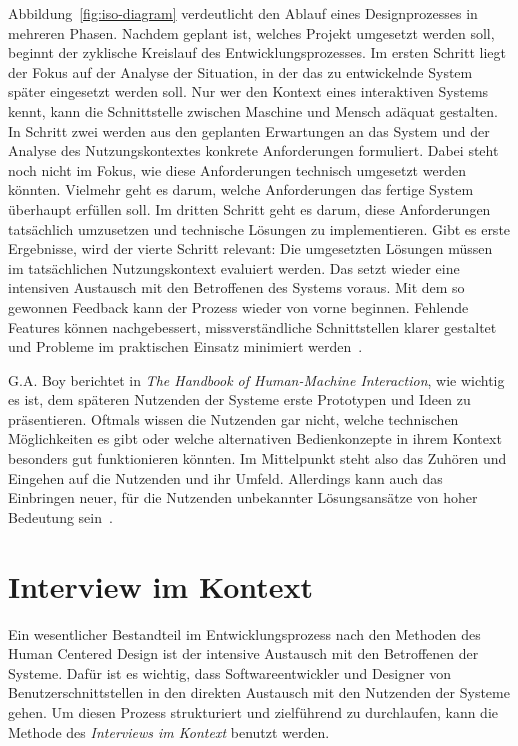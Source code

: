 Abbildung~\ref{fig:iso-diagram} verdeutlicht den Ablauf eines Designprozesses in
mehreren Phasen. Nachdem geplant ist, welches Projekt umgesetzt werden soll,
beginnt der zyklische Kreislauf des Entwicklungsprozesses. Im ersten Schritt
liegt der Fokus auf der Analyse der Situation, in der das zu entwickelnde
System später eingesetzt werden soll. Nur wer den Kontext eines interaktiven
Systems kennt, kann die Schnittstelle zwischen Maschine und Mensch adäquat
gestalten. In Schritt zwei werden aus den geplanten Erwartungen an das System und der Analyse des Nutzungskontextes konkrete Anforderungen formuliert. Dabei steht noch nicht im Fokus, wie diese Anforderungen
technisch umgesetzt werden könnten. Vielmehr geht es darum, welche
Anforderungen das fertige System überhaupt erfüllen soll. Im dritten Schritt
geht es darum, diese Anforderungen tatsächlich umzusetzen und technische
Lösungen zu implementieren. Gibt es erste Ergebnisse, wird der vierte Schritt
relevant: Die umgesetzten Lösungen müssen im tatsächlichen Nutzungskontext
evaluiert werden. Das setzt wieder eine intensiven Austausch mit den
Betroffenen des Systems voraus. Mit dem so gewonnen Feedback kann der Prozess
wieder von vorne beginnen. Fehlende Features können nachgebessert,
missverständliche Schnittstellen klarer gestaltet und Probleme im praktischen
Einsatz minimiert werden~\cite{ISO9241}.

G.A. Boy berichtet in \textit{The Handbook of Human-Machine Interaction}, wie
wichtig es ist, dem späteren Nutzenden der Systeme erste Prototypen und Ideen zu
präsentieren. Oftmals wissen die Nutzenden gar nicht, welche technischen
Möglichkeiten es gibt oder welche alternativen Bedienkonzepte in ihrem Kontext
besonders gut funktionieren könnten. Im Mittelpunkt steht also das Zuhören und Eingehen auf die
Nutzenden und ihr Umfeld. Allerdings kann auch das Einbringen neuer, für die Nutzenden
unbekannter Lösungsansätze von hoher Bedeutung sein~\cite{HMI-HCD}.

\section{Interview im Kontext}

Ein wesentlicher Bestandteil im Entwicklungsprozess nach den Methoden des Human
Centered Design ist der intensive Austausch mit den Betroffenen der Systeme.
Dafür ist es wichtig, dass Softwareentwickler und Designer von
Benutzerschnittstellen in den direkten Austausch mit den Nutzenden der Systeme
gehen. Um diesen Prozess strukturiert und zielführend zu durchlaufen, kann
die Methode des \textit{Interviews im Kontext} benutzt werden.

